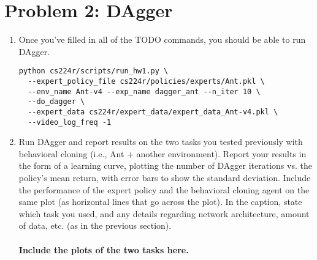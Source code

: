\documentclass[12pt]{article}
\begin{document}
\section*{Problem 2: DAgger}
\begin{enumerate}
\item Once you’ve filled in all of the TODO commands, you should be able to run DAgger.
\begin{tcolorbox}[width=\linewidth, sharp corners=all, colback=white!95!black]
\begin{verbatim}
python cs224r/scripts/run_hw1.py \
  --expert_policy_file cs224r/policies/experts/Ant.pkl \
  --env_name Ant-v4 --exp_name dagger_ant --n_iter 10 \
  --do_dagger \
  --expert_data cs224r/expert_data/expert_data_Ant-v4.pkl \
  --video_log_freq -1
\end{verbatim}
\end{tcolorbox}
\item Run DAgger and report results on the two tasks you tested previously with behavioral cloning (i.e., Ant + another environment). Report your results in the form of a learning curve, plotting the number of DAgger iterations vs. the policy’s mean return, with error bars to show the standard deviation. Include the performance of the expert policy and the behavioral cloning agent on the same plot (as horizontal lines that go across the plot). In the caption, state which task you used, and any details regarding network architecture, amount of data, etc. (as in the previous section).\\
\\
\textbf{\color{red}Include the plots of the two tasks here.}
\end{enumerate}

%
%
\end{document}
